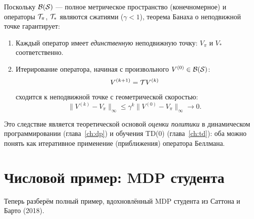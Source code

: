 \begin{corollary}
\label{cor:banach}
Поскольку $\mathcal{B}(\mathcal{S})$ — полное метрическое пространство (конечномерное) и операторы $\mathcal{T}_\pi$, $\mathcal{T}_*$ являются сжатиями ($\gamma < 1$), теорема Банаха о неподвижной точке гарантирует:
\begin{enumerate}
  \item Каждый оператор имеет \emph{единственную} неподвижную точку: $V_\pi$ и $V_*$ соответственно.
  \item Итерирование оператора, начиная с произвольного $V^{(0)} \in \mathcal{B}(\mathcal{S})$:
        \[V^{(k+1)} = \mathcal{T} V^{(k)}\]
        сходится к неподвижной точке с геометрической скоростью:
        \[
        \|V^{(k)} - V_\pi\|_\infty \le \gamma^k \|V^{(0)} - V_\pi\|_\infty \to 0.
        \]
\end{enumerate}
\end{corollary}

Это следствие является теоретической основой \emph{оценки политики} в динамическом программировании (глава~\ref{ch:dp}) и обучения TD(0) (глава~\ref{ch:td}): оба можно понять как итеративное применение (приближения) оператора Беллмана.


\section{Числовой пример: MDP студента}
\label{sec:student-mdp}

Теперь разберём полный пример, вдохновлённый MDP студента из Саттона и Барто (2018).

